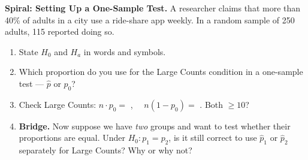 \documentclass[10pt]{article}
\begin{document}
\namedateperiod

\vspace{0.15in}

\textbf{Spiral: Setting Up a One-Sample Test.}
A researcher claims that more than 40\% of adults in a city use a ride-share app weekly.
In a random sample of 250 adults, 115 reported doing so.

\begin{enumerate}
  \item State $H_0$ and $H_a$ in words and symbols.

  \item Which proportion do you use for the Large Counts condition in a one-sample test ---
        $\hat p$ or $p_0$? \blank{2cm}

  \item Check Large Counts: $n \cdot p_0 = $ \blank{2cm}, $\quad n(1-p_0) = $ \blank{2cm}. \quad Both $\ge 10$? \blank{1.5cm}

  \item \textbf{Bridge.} Now suppose we have \textit{two} groups and want to test whether
        their proportions are equal. Under $H_0: p_1 = p_2$, is it still correct to use
        $\hat p_1$ or $\hat p_2$ separately for Large Counts? Why or why not?
\end{enumerate}
\end{document}
